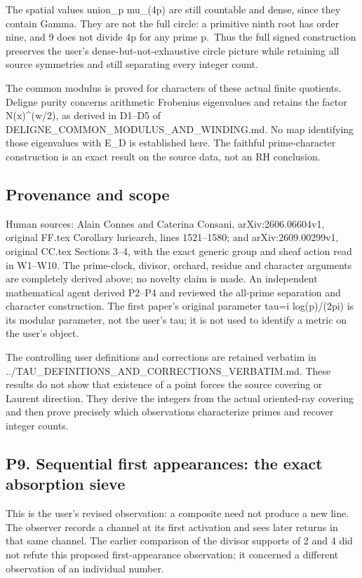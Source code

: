 \documentclass[
  11pt,
]{article}
\begin{document}
The spatial values union\_p mu\_(4p) are still countable and dense,
since they contain Gamma. They are not the full circle: a primitive
ninth root has order nine, and 9 does not divide 4p for any prime
p.~Thus the full signed construction preserves the user's
dense-but-not-exhaustive circle picture while retaining all source
symmetries and still separating every integer count.

The common modulus is proved for characters of these actual finite
quotients. Deligne purity concerns arithmetic Frobenius eigenvalues and
retains the factor N(x)\^{}(w/2), as derived in D1--D5 of
DELIGNE\_COMMON\_MODULUS\_AND\_WINDING.md. No map identifying those
eigenvalues with E\_D is established here. The faithful prime-character
construction is an exact result on the source data, not an RH
conclusion.

\subsection{Provenance and scope}\label{provenance-and-scope}

Human sources: Alain Connes and Caterina Consani, arXiv:2606.06604v1,
original FF.tex Corollary luriearch, lines 1521--1580; and
arXiv:2609.00299v1, original CC.tex Sections 3--4, with the exact
generic group and sheaf action read in W1--W10. The prime-clock,
divisor, orchard, residue and character arguments are completely derived
above; no novelty claim is made. An independent mathematical agent
derived P2--P4 and reviewed the all-prime separation and character
construction. The first paper's original parameter tau=i log(p)/(2pi) is
its modular parameter, not the user's tau; it is not used to identify a
metric on the user's object.

The controlling user definitions and corrections are retained verbatim
in ../TAU\_DEFINITIONS\_AND\_CORRECTIONS\_VERBATIM.md. These results do
not show that existence of a point forces the source covering or Laurent
direction. They derive the integers from the actual oriented-ray
covering and then prove precisely which observations characterize primes
and recover integer counts.

\subsection{P9. Sequential first appearances: the exact absorption
sieve}\label{p9.-sequential-first-appearances-the-exact-absorption-sieve}

This is the user's revised observation: a composite need not produce a
new line. The observer records a channel at its first activation and
sees later returns in that same channel. The earlier comparison of the
divisor supports of 2 and 4 did not refute this proposed
first-appearance observation; it concerned a different observation of an
individual number.
\end{document}
